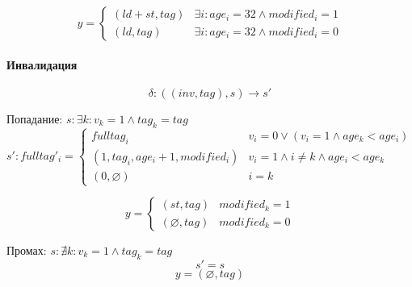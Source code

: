 \[
y =
\begin{cases}
	(ld+st,tag) & \exists i : age_i = 32 \land modified_i = 1 \\
	(ld,tag) & \exists i : age_i = 32 \land modified_i = 0
\end{cases}
\]

\paragraph*{Инвалидация}

$$\delta : ((inv,tag),s) \rightarrow s'$$

Попадание: $s: \exists k : v_k = 1 \land tag_k = tag$
\[
s':fulltag'_i =
\begin{cases}
	fulltag_i & v_i = 0 \lor (v_i = 1 \land age_k < age_i)\\
	(1,tag_i,age_{i}+1,modified_i) & v_i = 1 \land i \neq k \land age_i < age_k \\
	(0,\varnothing) & i = k
\end{cases}
\]

\[
y =
\begin{cases}
	(st,tag) & modified_k = 1 \\
	(\varnothing,tag) & modified_k = 0
\end{cases}
\]

Промах: $s: \nexists k : v_k = 1 \land tag_k = tag$
$$s' = s$$
$$y = (\varnothing,tag)$$



